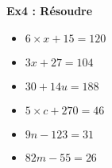 \textbf{Ex4 : Résoudre} \vspace{-0.4cm}

\begin{multicols}{3}
\begin{itemize}[label={$\bullet$}]
  \item $6 \times x + 15 = 120$ 
  \item $3x + 27 = 104$ \columnbreak 
  \item $30 + 14u = 188$ 
  \item $5 \times c + 270 = 46$ \columnbreak 
  \item $9n - 123 = 31$ 
  \item $82m - 55 = 26$ 
\end{itemize}
\end{multicols}
\Pointilles[24]



